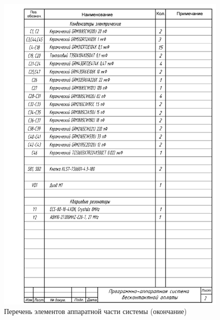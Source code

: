 \begin{figure}[H]
    \centering
    \includegraphics[height=0.95\textheight]{appendices/Спецификация Лист 2.pdf}
    \caption{Перечень элементов аппаратной части системы (окончание)}
\end{figure}

